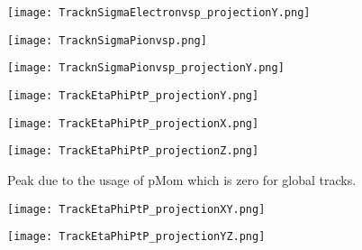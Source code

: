 \documentclass{beamer}
\begin{document}
\begin{frame}
  \begin{figure}[h!]
  \centering
  \texttt{[image: TracknSigmaElectronvsp\_projectionY.png]}
  \end{figure}
\end{frame}

\begin{frame}
  \begin{figure}[h!]
  \centering
  \texttt{[image: TracknSigmaPionvsp.png]}
  \end{figure}
\end{frame}

\begin{frame}
  \begin{figure}[h!]
  \centering
  \texttt{[image: TracknSigmaPionvsp\_projectionY.png]}
  \end{figure}
\end{frame}

\begin{frame}
	\begin{figure}[h!]
		\centering
		\texttt{[image: TrackEtaPhiPtP\_projectionY.png]}
	\end{figure}
\end{frame}

\begin{frame}
  \begin{figure}[h!]
  \centering
  \texttt{[image: TrackEtaPhiPtP\_projectionX.png]}
  \end{figure}
\end{frame}

\begin{frame}
  \begin{figure}[h!]
  \centering
  \texttt{[image: TrackEtaPhiPtP\_projectionZ.png]}
  \caption{Peak due to the usage of pMom which is zero for global tracks.}
  \end{figure}
\end{frame}

\begin{frame}
  \begin{figure}[h!]
  \centering
  \texttt{[image: TrackEtaPhiPtP\_projectionXY.png]}
  \end{figure}
\end{frame}

\begin{frame}
  \begin{figure}[h!]
  \centering
  \texttt{[image: TrackEtaPhiPtP\_projectionYZ.png]}
  \end{figure}
\end{frame}
\end{document}
